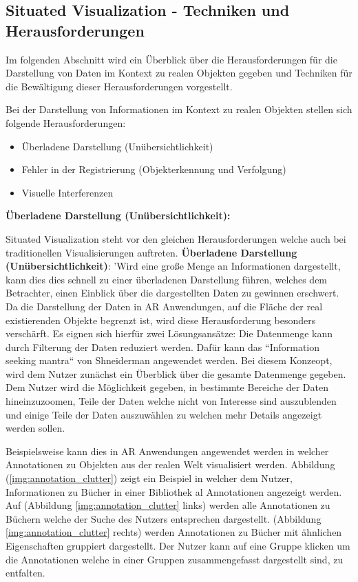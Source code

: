 \subsection{Situated Visualization - Techniken und Herausforderungen}

Im folgenden Abschnitt wird ein Überblick über die Herausforderungen für die Darstellung von Daten im Kontext zu realen Objekten 
gegeben und Techniken für die Bewältigung dieser Herausforderungen vorgestellt.

\cite{DieterSchmalstieg2016} Bei der Darstellung von Informationen im Kontext zu realen Objekten stellen sich folgende Herausforderungen:

\begin{itemize}
	\item Überladene Darstellung (Unübersichtlichkeit)
	\item Fehler in der Registrierung (Objekterkennung und Verfolgung)
	\item Visuelle Interferenzen
\end{itemize}

\textbf{Überladene Darstellung (Unübersichtlichkeit):}

\cite[S.~241]{DieterSchmalstieg2016} Situated Visualization steht vor den gleichen Herausforderungen welche auch bei traditionellen Visualisierungen auftreten. 
\textbf{Überladene Darstellung (Unübersichtlichkeit)}: 'Wird eine große Menge an Informationen dargestellt, kann dies dies schnell zu einer überladenen Darstellung führen, welches dem Betrachter, einen Einblick 
über die dargestellten Daten zu gewinnen erschwert. Da die Darstellung der Daten in AR Anwendungen, auf die Fläche der real existierenden Objekte begrenzt ist, 
wird diese Herausforderung besonders verschärft. Es eignen sich hierfür zwei Lösungsansätze: Die Datenmenge kann durch Filterung der Daten reduziert werden. 
Dafür kann das ``Information seeking mantra`` von Shneiderman \cite{Shneiderman1996} angewendet werden. 
Bei diesem Konzeopt, wird dem Nutzer zunächst ein Überblick über die gesamte Datenmenge gegeben. Dem Nutzer wird die Möglichkeit gegeben, in bestimmte Bereiche der Daten hineinzuzoomen, Teile der Daten 
welche nicht von Interesse sind auszublenden und einige Teile der Daten auszuwählen zu welchen mehr Details angezeigt werden sollen. 

Beispielsweise kann dies in AR Anwendungen angewendet werden in welcher Annotationen zu Objekten aus der realen Welt visualisiert werden. 
Abbildung (\ref{img:annotation_clutter}) zeigt ein Beispiel in welcher dem Nutzer, Informationen zu Bücher in einer Bibliothek al Annotationen angezeigt werden. Auf (Abbildung \ref{img:annotation_clutter} links) werden 
alle Annotationen zu Büchern welche der Suche des Nutzers entsprechen dargestellt. (Abbildung \ref{img:annotation_clutter} rechts) werden Annotationen zu Bücher mit ähnlichen Eigenschaften gruppiert dargestellt. 
Der Nutzer kann auf eine Gruppe klicken um die Annotationen welche in einer Gruppen zusammengefasst dargestellt sind, zu entfalten. 

